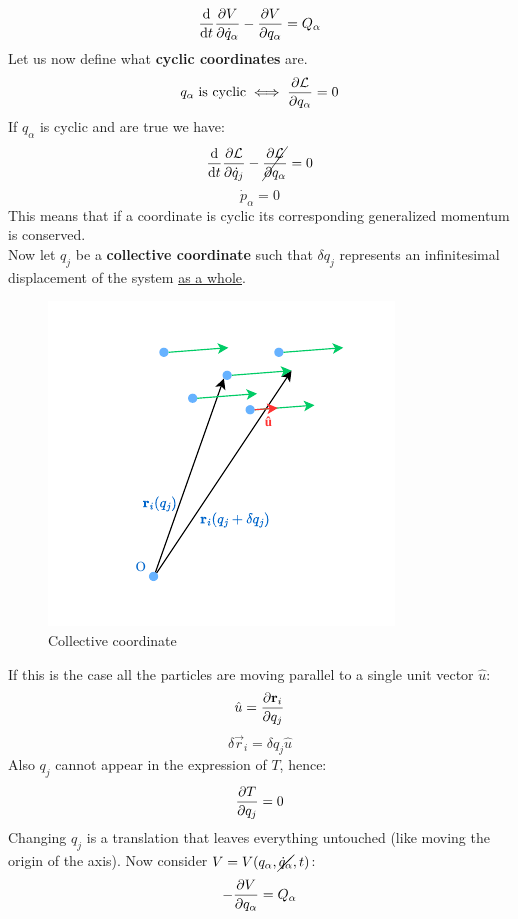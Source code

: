 \begin{equation}
    \dv{}{t}\pdv{V}{\dot{q}_{\alpha}}-\pdv{V}{q_{\alpha}} = Q_{\alpha}
\end{equation}
Let us now define what \textbf{cyclic coordinates} are.
\begin{equation}
    q_{\alpha}\;\text{is cyclic} \iff \pdv{\lagr}{q_{\alpha}} = 0
\end{equation}
If $q_{\alpha}$ is cyclic and \eleref\;are true we have:
\begin{equation}
    \dv{}{t} \pdv{\lagr}{\dot{q}_j} - \cancel{\pdv{\lagr}{q_{\alpha}}} = 0
\end{equation}
\begin{equation}
    \dot{p}_{\alpha} = 0
\end{equation}
This means that if a coordinate is cyclic its corresponding generalized momentum is conserved.\\
Now let $q_j$ be a \textbf{collective coordinate} such that $\delta q_j$ represents an infinitesimal displacement of the system \underline{as a whole}.
\begin{figure}[H]
    \centering
    \includegraphics[width=0.4\linewidth]{res/svg/collectivecoord.drawio}
    \caption{Collective coordinate}
\end{figure}
If this is the case all the particles are moving parallel to a single unit vector $\hat{u}$:
\begin{equation}
    \hat{u} = \pdv{ \vec{r}_i}{ q_j}
\end{equation}
\begin{equation}
    \delta \vec{r}_i = \delta q_j \hat{u}
\end{equation}
Also $q_j$ cannot appear in the expression of $T$, hence:
\begin{equation}
    \pdv{T}{q_j}=0
\end{equation}
Changing $q_j$ is a translation that leaves everything untouched (like moving the origin of the axis). Now consider $V=V(q_{\alpha},\cancel{\dot{q}_{\alpha}},t)$:
\begin{equation}
    -\pdv{V}{q_{\alpha}} = Q_{\alpha}
\end{equation}
